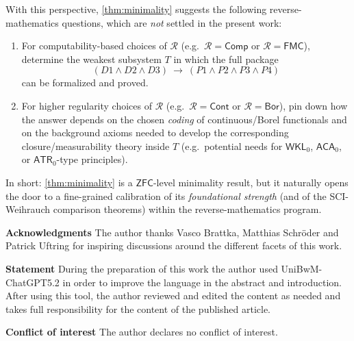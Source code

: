 \documentclass{lmcs} %
\theoremstyle{plain}
\theoremstyle{plain}
\theoremstyle{definition}
\theoremstyle{remark}
\theoremstyle{definition}
\theoremstyle{remark}
\numberwithin{equation}{section}
\newcommand{\Comp}{\mathsf{Comp}}
\begin{document}
With this perspective, \cref{thm:minimality} suggests the following reverse-mathematics
questions, which are \textit{not} settled in the present work:
\begin{enumerate}
\item For computability-based choices of $\mathcal R$ (e.g.\ $\mathcal R=\Comp$ or
$\mathcal R=\mathsf{FMC}$), determine the weakest subsystem $T$ in which the full package
\[
(D1\wedge D2\wedge D3)\ \rightarrow\ (P1\wedge P2\wedge P3\wedge P4)
\]
can be formalized and proved.
\item For higher regularity choices of $\mathcal R$ (e.g.\ $\mathcal R =\mathsf{Cont}$ or $\mathcal R=\mathsf{Bor}$),
pin down how the answer depends on the chosen \textit{coding} of continuous/Borel functionals and on
the background axioms needed to develop the corresponding closure/measurability theory inside $T$
(e.g.\ potential needs for $\mathsf{WKL}_0$, $\mathsf{ACA}_0$, or $\mathsf{ATR}_0$-type principles).
\end{enumerate}
In short: \cref{thm:minimality} is a $\mathsf{ZFC}$-level minimality result, but it naturally opens the door to a
fine-grained calibration of its \textit{foundational strength} (and of the SCI-Weihrauch comparison theorems)
within the reverse-mathematics program.

\textbf{Acknowledgments } The author thanks Vasco Brattka, Matthias Schröder and Patrick Uftring for inspiring discussions around the different facets of this work.

\textbf{Statement } During the preparation of this work the author used UniBwM-ChatGPT5.2 in order to improve the language in the abstract and introduction. After using this tool, the author reviewed and edited the content as needed and takes full responsibility for the content of the published article.

\textbf{Conflict of interest } The author declares no conflict of interest.

      
    
\end{document}
